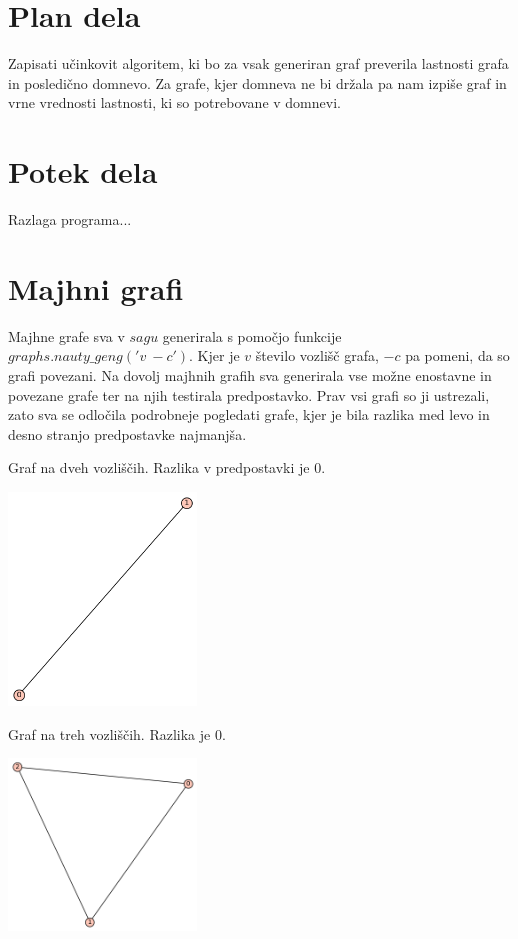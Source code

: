 \documentclass[10pt, a4paper]{article}
\begin{document}
\section{Plan dela}
Zapisati učinkovit algoritem, ki bo za vsak generiran graf preverila lastnosti grafa in posledično domnevo. Za grafe, kjer  domneva ne bi držala pa nam izpiše graf in vrne vrednosti lastnosti, ki so potrebovane v domnevi.

\section{Potek dela}

Razlaga programa...

\section{Majhni grafi}

Majhne grafe sva v $sagu$ generirala s pomočjo funkcije $graphs.nauty\_geng('v\ -c')$. Kjer je $v$ število vozlišč grafa, $-c$ pa pomeni, da so grafi povezani. Na dovolj majhnih grafih sva generirala vse možne enostavne in povezane grafe ter na njih testirala predpostavko. Prav vsi grafi so ji ustrezali, zato sva se odločila podrobneje pogledati grafe, kjer je bila razlika med levo in desno stranjo predpostavke najmanjša.

Graf na dveh vozliščih. Razlika v predpostavki je $0$.

\includegraphics[width=5cm]{min_graf_2}

Graf na treh vozliščih. Razlika je $0$.

\includegraphics[width=5cm]{min_graf_3}
\end{document}
